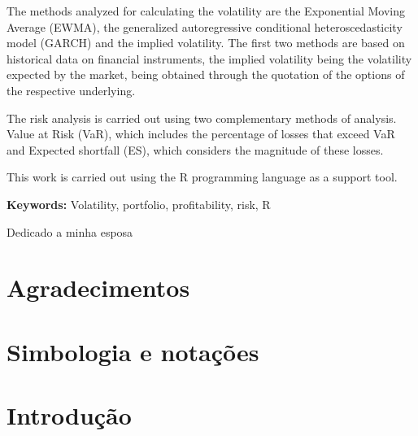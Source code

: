 \documentclass[
  12pt,
  brazil,
  a4paper,
  openany]{book}
\begin{document}
The methods analyzed for calculating the volatility are the Exponential Moving Average (EWMA), the generalized autoregressive conditional heteroscedasticity model (GARCH) and the implied volatility. The first two methods are based on historical data on financial instruments, the implied volatility being the volatility expected by the market, being obtained through the quotation of the options of the respective underlying.

The risk analysis is carried out using two complementary methods of analysis. Value at Risk (VaR), which includes the percentage of losses that exceed VaR and Expected shortfall (ES), which considers the magnitude of these losses.

This work is carried out using the R programming language as a support tool.

\bigbreak

\noindent\textbf{Keywords:} Volatility, portfolio, profitability, risk, R

\newenvironment{dedication}
  {\clearpage           %
   \itshape             %
   \raggedleft          %
  }
  {\par %
   \vspace{\stretch{3}} %
   \clearpage           %
  }
\begin{dedication}
{\Large Dedicado a minha esposa\par}
\end{dedication}

\chapter*{Agradecimentos}

\renewcommand*\contentsname{Índice}
{
\setcounter{tocdepth}{2}
\tableofcontents
}
\listoftables
\listoffigures
{}
\hypertarget{simbologia-e-notauxe7uxf5es}{%
\chapter*{Simbologia e notações}\label{simbologia-e-notauxe7uxf5es}}

\mainmatter

\hypertarget{intro}{%
\chapter*{Introdução}\label{intro}}
\end{document}
